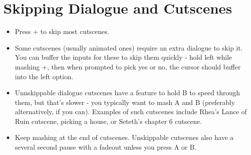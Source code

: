 \section*{Skipping Dialogue and Cutscenes}

\begin{itemize}
\item Press + to skip most cutscenes.
\item Some cutscenes (usually animated ones) require an extra dialogue to skip it. You can buffer the inputs for these to skip them quickly - hold left while mashing +, then when prompted to pick yes or no, the cursor should buffer into the left option.
\item Unnskippable dialogue cutscenes have a feature to hold B to speed through them, but that's slower - you typically want to mash A and B (preferably alternatively, if you can). Examples of such cutscenes include Rhea's Lance of Ruin cutscene, picking a house, or Seteth's chapter 6 cutscene.
\item Keep mashing at the end of cutscenes. Unskippable cutscenes also have a several second pause with a fadeout unless you press A or B.
\end{itemize}